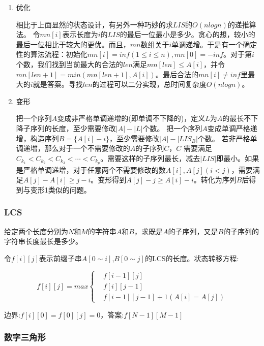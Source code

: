\documentclass[11pt]{article}
\begin{document}
\begin{enumerate}
\item 优化
\label{sec:org997c49a}

相比于上面显然的状态设计，有另外一种巧妙的求\(LIS\)的\(O(nlogn)\)的递推算法。
令\(mn[i]\)表示长度为\(i\)的\(LIS\)的最后一位最小是多少。贪心的想，较小的最后一位相比于较大的更优。而且，\(mn\)数组关于\(i\)单调递增。于是有一个确定性的算法流程：初始化\(mn[i]=inf(1 \leq i \leq n),mn[0]=-inf\)。对于第\(i\)个数，我们找到当前最大的合法的\(len\)满足\(mn[len] \leq A[i]\)，并令\(mn[len+1]=min(mn[len+1],A[i])\)。最后合法的\(mn[i] \neq inf\)里最大的\(i\)就是答案。寻找\(len\)的过程可以二分实现，总时间复杂度\(O(nlogn)\)。

\item 变形
\label{sec:orgaabdc8e}

把一个序列\(A\)变成非严格单调递增的(即单调不下降的)，定义\(L\)为\(A\)的最长不下降子序列的长度，至少需要修改\(|A|-|{L}|\)个数。
把一个序列\(A\)变成单调严格递增，构造序列\(B=\{A[i]-i\}\)，至少需要修改\(|A|-|{LIS_B}|\)个数。
若非严格单调递增，那么对于一个不需要修改的\(A\)的子序列\(C\)，\(C\) 需要满足\(C_{k_1} < C_{k_2} < C_{k_3} < \cdots < C_{k_p}\)。需要这样的子序列最长，减去\(|LIS|\)即最小。如果是严格单调递增，对于任意两个不需要修改的数\(A[i],A[j] (i < j)\)，需要满足\(A[j]-A[i] \geq j-i\)。变形得到\(A[j]-j \geq A[i]-i\)。转化为序列\(B\)后得到与变形1类似的问题。
\end{enumerate}
\subsubsection{LCS}
\label{sec:org5b85548}

给定两个长度分别为\(N\)和\(M\)的字符串\(A\)和\(B\)，求既是\(A\)的子序列，又是\(B\)的子序列的字符串长度最长是多少。

令\(f[i][j]\)表示前缀子串\(A[0 \sim i]\),\(B[0 \sim j]\)的LCS的长度。状态转移方程:

\[
f[i][j]=max\left\{\begin{aligned}
&f[i-1][j]\\
&f[i][j-1]\\
&f[i-1][j-1]+1 (A[i]=A[j])
\end{aligned}\right. 
\]

边界:\(f[i][0]=f[0][j]=0\)，答案:\(f[N-1][M-1]\)
\subsubsection{数字三角形}
\label{sec:orgc83575e}
\end{document}
